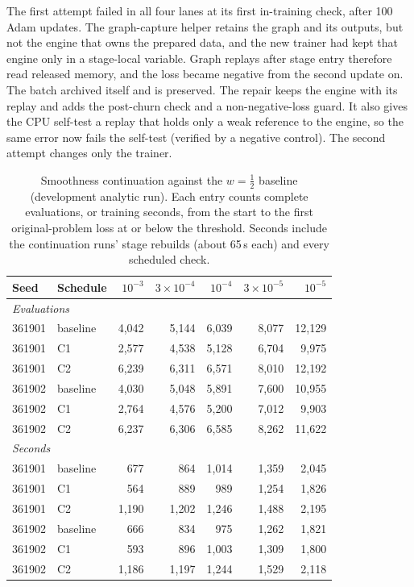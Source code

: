 \documentclass[11pt]{article}
\begin{document}
The first attempt failed in all four lanes at its first in-training check,
after 100 Adam updates. The graph-capture helper retains the graph and its
outputs, but not the engine that owns the prepared data, and the new trainer
had kept that engine only in a stage-local variable. Graph replays after
stage entry therefore read released memory, and the loss became negative from
the second update on. The batch archived itself and is preserved. The repair
keeps the engine with its replay and adds the post-churn check and a
non-negative-loss guard. It also gives the CPU self-test a replay that holds
only a weak reference to the engine, so the same error now fails the
self-test (verified by a negative control). The second attempt changes only
the trainer.

\begin{table}[htbp]\centering\small
\setlength{\tabcolsep}{5pt}
\caption{Smoothness continuation against the $w=\tfrac12$ baseline (development analytic run). Each entry counts complete evaluations, or training seconds, from the start to the first original-problem loss at or below the threshold. Seconds include the continuation runs' stage rebuilds (about 65\,s each) and every scheduled check.}
\label{tab:c36v3training}
\begin{tabular}{llrrrrr}\toprule
Seed & Schedule & $10^{-3}$ & $3\times10^{-4}$ & $10^{-4}$ & $3\times10^{-5}$ & $10^{-5}$\\\midrule
\multicolumn{7}{l}{\emph{Evaluations}}\\
361901 & baseline & 4,042 & 5,144 & 6,039 & 8,077 & 12,129\\
361901 & C1 & 2,577 & 4,538 & 5,128 & 6,704 & 9,975\\
361901 & C2 & 6,239 & 6,311 & 6,571 & 8,010 & 12,192\\
361902 & baseline & 4,030 & 5,048 & 5,891 & 7,600 & 10,955\\
361902 & C1 & 2,764 & 4,576 & 5,200 & 7,012 & 9,903\\
361902 & C2 & 6,237 & 6,306 & 6,585 & 8,262 & 11,622\\\midrule
\multicolumn{7}{l}{\emph{Seconds}}\\
361901 & baseline & 677 & 864 & 1,014 & 1,359 & 2,045\\
361901 & C1 & 564 & 889 & 989 & 1,254 & 1,826\\
361901 & C2 & 1,190 & 1,202 & 1,246 & 1,488 & 2,195\\
361902 & baseline & 666 & 834 & 975 & 1,262 & 1,821\\
361902 & C1 & 593 & 896 & 1,003 & 1,309 & 1,800\\
361902 & C2 & 1,186 & 1,197 & 1,244 & 1,529 & 2,118
\\\bottomrule\end{tabular}
\end{table}
\end{document}
